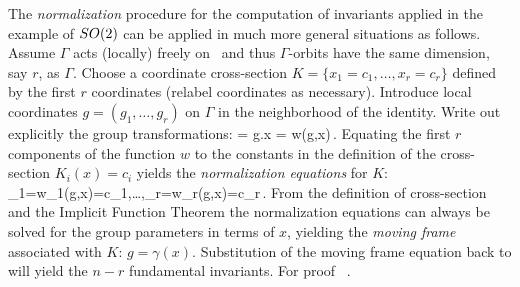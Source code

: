  The \emph{normalization} procedure for the computation of invariants applied
in the example of $SO(2)$ can be applied in much more general situations as follows. Assume $\Gamma$ acts (locally) freely on \Manif\  and
thus $\Gamma$-orbits have the same dimension, say $r$, as $\Gamma$.  Choose a coordinate cross-section $K=\{x_1=c_1,\ldots,x_r=c_r\}$ defined by the first $r$ coordinates (relabel coordinates as necessary). Introduce local coordinates $g=(g_1,\ldots,g_r)$ on $\Gamma$ in
the neighborhood of the identity. Write out explicitly the group transformations:
\beq
	= g.x = w(g,x)\,.
	\label{eq:transNorm}
\eeq
Equating the first $r$ components of the function $w$ to the constants in the definition
of the cross-section $K_i(x)=c_i$ yields the \emph{normalization equations} for $K$:
\beq
	_1=w_1(g,x)=c_1,\ldots,_r=w_r(g,x)=c_r\,.
	\label{eq:normalization}
\eeq
From the definition of cross-section and the Implicit Function Theorem the normalization equations
 can always be solved for the group parameters in terms of $x$,
yielding the \emph{moving frame} associated with $K$: $g=\gamma(x)$. Substitution
of the moving frame equation back to  will yield the $n-r$
fundamental invariants. For proof \cf~.


